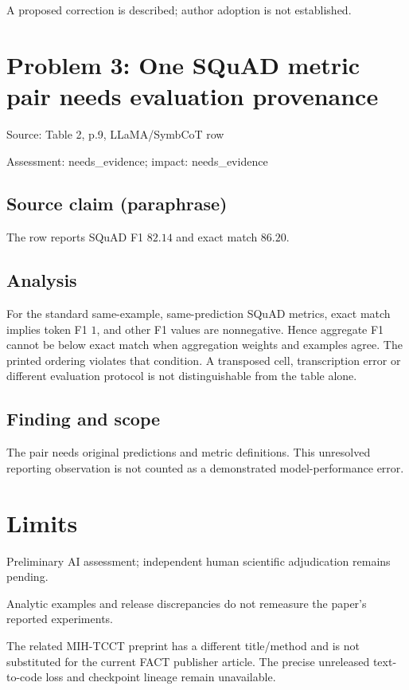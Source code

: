 \documentclass[11pt]{article}
\begin{document}
A proposed correction is described; author adoption is not established.

\section*{Problem 3: One SQuAD metric pair needs evaluation provenance}

Source: Table 2, p.9, LLaMA/SymbCoT row

Assessment: needs\_evidence; impact: needs\_evidence

\subsection*{Source claim (paraphrase)}

The row reports SQuAD F1 \(82.14\) and exact match \(86.20\).

\subsection*{Analysis}

For the standard same-example, same-prediction SQuAD metrics, exact match implies token F1 \(1\), and other F1 values are nonnegative. Hence aggregate F1 cannot be below exact match when aggregation weights and examples agree. The printed ordering violates that condition. A transposed cell, transcription error or different evaluation protocol is not distinguishable from the table alone.

\subsection*{Finding and scope}

The pair needs original predictions and metric definitions. This unresolved reporting observation is not counted as a demonstrated model-performance error.

\section*{Limits}

Preliminary AI assessment; independent human scientific adjudication remains pending.\par

Analytic examples and release discrepancies do not remeasure the paper’s reported experiments.\par

The related MIH-TCCT preprint has a different title/method and is not substituted for the current FACT publisher article. The precise unreleased text-to-code loss and checkpoint lineage remain unavailable.\par
\end{document}
